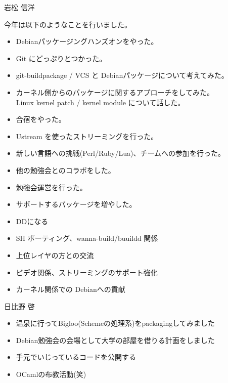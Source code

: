 \begin{prework}{岩松 信洋}

今年は以下のようなことを行いました。
\begin{itemize}
 \item Debianパッケージングハンズオンをやった。
 \item Git にどっぷりとつかった。
 \item git-buildpackage / VCS と Debianパッケージについて考えてみた。
 \item カーネル側からのパッケージに関するアプローチをしてみた。\\
   Linux kernel patch / kernel module について話した。
 \item 合宿をやった。
 \item Ustream を使ったストリーミングを行った。
 \item 新しい言語への挑戦(Perl/Ruby/Lua)、チームへの参加を行った。
 \item 他の勉強会とのコラボをした。
 \item 勉強会運営を行った。
 \item サポートするパッケージを増やした。
\end{itemize}


\begin{itemize}
 \item DDになる
 \item SH ポーティング、wanna-build/buuildd 関係
 \item 上位レイヤの方との交流
 \item ビデオ関係、ストリーミングのサポート強化
 \item カーネル関係での Debianへの貢献
\end{itemize}

\end{prework}


\begin{prework}{日比野 啓}

\begin{itemize}
\item 温泉に行ってBigloo(Schemeの処理系)をpackagingしてみました
\item Debian勉強会の会場として大学の部屋を借りる計画をしました
\end{itemize}

\begin{itemize}
\item 手元でいじっているコードを公開する
\item OCamlの布教活動(笑)
\end{itemize}

\end{prework}
